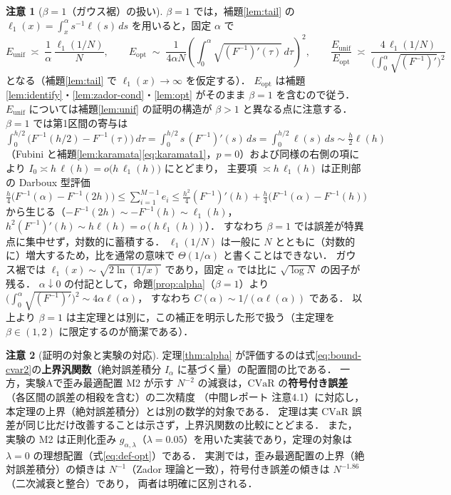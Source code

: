 \documentclass[a4paper,10pt]{jsarticle}
\theoremstyle{definition}
\newtheorem{remark}{注意}[section]
\newcommand{\CVaR}{\mathrm{CVaR}}
\newcommand{\Finv}{F^{-1}}
\newcommand{\Eunif}{E_{\mathrm{unif}}}
\newcommand{\Eopt}{E_{\mathrm{opt}}}
\begin{document}
\begin{remark}[$\beta=1$（ガウス裾）の扱い]
\label{rem:beta1}
$\beta=1$ では，補題\ref{lem:tail} の $\ell_1(x)=\int_x^\alpha s^{-1}\ell(s)\,ds$ を用いると，固定 $\alpha$ で
\begin{equation*}
  \Eunif\;\asymp\;\frac1\alpha\,\frac{\ell_1(1/N)}{N},\qquad
  \Eopt\;\sim\;\frac1{4\alpha N}\left(\int_0^\alpha\sqrt{(\Finv)'(\tau)}\,d\tau\right)^{2},\qquad
  \frac{\Eunif}{\Eopt}\;\asymp\;\frac{4\,\ell_1(1/N)}{\bigl(\int_0^\alpha\sqrt{(\Finv)'}\bigr)^{2}}
\end{equation*}
となる（補題\ref{lem:tail} で $\ell_1(x)\to\infty$ を仮定する）．
$\Eopt$ は補題\ref{lem:identify}・\ref{lem:zador-cond}・\ref{lem:opt} がそのまま $\beta=1$ を含むので従う．
$\Eunif$ については補題\ref{lem:unif} の証明の構造が $\beta>1$ と異なる点に注意する．$\beta=1$ では第1区間の寄与は
$\int_0^{h/2}\bigl(\Finv(h/2)-\Finv(\tau)\bigr)\,d\tau=\int_0^{h/2}s\,(\Finv)'(s)\,ds=\int_0^{h/2}\ell(s)\,ds\sim\tfrac h2\ell(h)$
（Fubini と補題\ref{lem:karamata}\eqref{eq:karamata1}，$p=0$）および同様の右側の項により $I_0\asymp h\,\ell(h)=o\bigl(h\,\ell_1(h)\bigr)$ にとどまり，
主要項 $\asymp h\,\ell_1(h)$ は正則部の Darboux 型評価
$\frac h4\bigl(\Finv(\alpha)-\Finv(2h)\bigr)\le\sum_{i=1}^{M-1}e_i\le\frac{h^2}4(\Finv)'(h)+\frac h4\bigl(\Finv(\alpha)-\Finv(h)\bigr)$
から生じる（$-\Finv(2h)\sim-\Finv(h)\sim\ell_1(h)$，$h^2(\Finv)'(h)\sim h\ell(h)=o(h\ell_1(h))$）．
すなわち $\beta=1$ では誤差が特異点に集中せず，対数的に蓄積する．
$\ell_1(1/N)$ は一般に $N$ とともに（対数的に）増大するため，比を通常の意味で $\Theta(1/\alpha)$ と書くことはできない．
ガウス裾では $\ell_1(x)\sim\sqrt{2\ln(1/x)}$ であり，固定 $\alpha$ では比に $\sqrt{\log N}$ の因子が残る．
$\alpha\downarrow0$ の付記として，命題\ref{prop:alpha}（$\beta=1$）より $\bigl(\int_0^\alpha\sqrt{(\Finv)'}\bigr)^2\sim4\alpha\ell(\alpha)$，
すなわち $C(\alpha)\sim1/(\alpha\ell(\alpha))$ である．
以上より $\beta=1$ は主定理とは別に，この補正を明示した形で扱う（主定理を $\beta\in(1,2)$ に限定するのが簡潔である）．
\end{remark}

\begin{remark}[証明の対象と実験の対応]
\label{rem:scope}
定理\ref{thm:alpha} が評価するのは式\eqref{eq:bound-cvar2}の\textbf{上界汎関数}（絶対誤差積分 $I_\alpha$ に基づく量）の配置間の比である．
一方，実験Aで歪み最適配置 M2 が示す $N^{-2}$ の減衰は，$\CVaR$ の\textbf{符号付き誤差}（各区間の誤差の相殺を含む）の二次精度
（中間レポート 注意4.1）に対応し，本定理の上界（絶対誤差積分）とは別の数学的対象である．
定理は実 $\CVaR$ 誤差が同じ比だけ改善することは示さず，上界汎関数の比較にとどまる．
また，実験の M2 は正則化歪み $g_{\alpha,\lambda}$（$\lambda=0.05$）を用いた実装であり，定理の対象は $\lambda=0$ の理想配置（式\eqref{eq:def-opt}）である．
実測では，歪み最適配置の上界（絶対誤差積分）の傾きは $N^{-1}$（Zador 理論と一致），符号付き誤差の傾きは $N^{-1.86}$（二次減衰と整合）であり，
両者は明確に区別される．
\end{remark}
\end{document}
